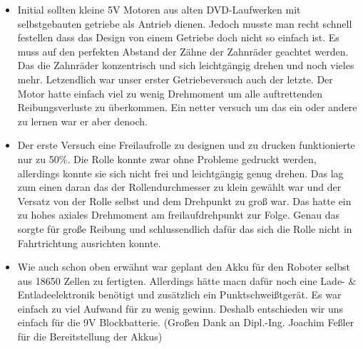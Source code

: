 \begin{flushleft}
    \begin{itemize}
    \item   Initial sollten kleine 5V Motoren aus alten DVD-Laufwerken mit selbstgebauten getriebe als Antrieb dienen.
            Jedoch musste man recht schnell festellen dass das Design von einem Getriebe doch nicht so einfach ist.
            Es muss auf den perfekten Abstand der Zähne der Zahnräder geachtet werden. Das die Zahnräder konzentrisch und 
            sich leichtgängig drehen und noch vieles mehr. Letzendlich war unser erster Getriebeversuch auch der letzte.
            Der Motor hatte einfach viel zu wenig Drehmoment um alle auftrettenden Reibungsverluste zu überkommen.
            Ein netter versuch um das ein oder andere zu lernen war er aber denoch.

    \item   Der erste Versuch eine Freilaufrolle zu designen und zu drucken funktionierte nur zu 50\%.
            Die Rolle konnte zwar ohne Probleme gedruckt werden, allerdings konnte sie sich nicht frei und leichtgängig genug drehen.
            Das lag zum einen daran das der Rollendurchmesser zu klein gewählt war und der Versatz von der Rolle selbst und dem Drehpunkt zu groß war.
            Das hatte ein zu hohes axiales Drehmoment am freilaufdrehpunkt zur Folge. 
            Genau das sorgte für große Reibung und schlussendlich dafür das sich die Rolle nicht in Fahrtrichtung ausrichten konnte.

    \item   Wie auch schon oben erwähnt war geplant den Akku für den Roboter selbst aus 18650 Zellen zu fertigten.
            Allerdings hätte macn dafür noch eine Lade- \& Entladeelektronik benötigt und zusätzlich ein Punktschweißtgerät.
            Es war einfach zu viel Aufwand für zu wenig gewinn. Deshalb entschieden wir uns einfach für die 9V Blockbatterie.
            (Großen Dank an Dipl.-Ing. Joachim Feßler für die Bereitstellung der Akkus)

    \end{itemize}
\end{flushleft}